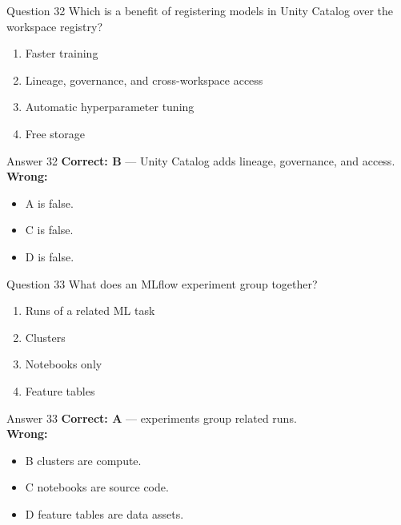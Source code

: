 \documentclass[aspectratio=169,11pt]{beamer}
\begin{document}
	\begin{frame}{Question 32}
		Which is a benefit of registering models in Unity Catalog over the workspace registry?
		\begin{enumerate}[label=\Alph*.]
			\item Faster training
			\item Lineage, governance, and cross-workspace access
			\item Automatic hyperparameter tuning
			\item Free storage
		\end{enumerate}
	\end{frame}
	\begin{frame}{Answer 32}
		\textbf{Correct: B} --- Unity Catalog adds lineage, governance, and access.\\
		\vspace{0.5em}
		\textbf{Wrong:}
		\begin{itemize}
			\item A is false.
			\item C is false.
			\item D is false.
		\end{itemize}
	\end{frame}
	
	\begin{frame}{Question 33}
		What does an MLflow experiment group together?
		\begin{enumerate}[label=\Alph*.]
			\item Runs of a related ML task
			\item Clusters
			\item Notebooks only
			\item Feature tables
		\end{enumerate}
	\end{frame}
	\begin{frame}{Answer 33}
		\textbf{Correct: A} --- experiments group related runs.\\
		\vspace{0.5em}
		\textbf{Wrong:}
		\begin{itemize}
			\item B clusters are compute.
			\item C notebooks are source code.
			\item D feature tables are data assets.
		\end{itemize}
	\end{frame}
	
\end{document}
